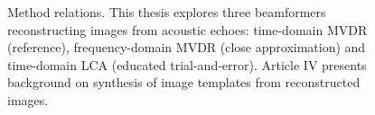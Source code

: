 {%
% 
% 
% 
% 

\begin{figure}[tp]\label{2_fig_article_relation}
\caption{Method relations. This thesis explores three beamformers reconstructing images from acoustic echoes: time-domain MVDR (reference), frequency-domain MVDR (close approximation) and time-domain LCA (educated trial-and-error). Article IV presents background on synthesis of image templates from reconstructed images. }
\end{figure}

}
